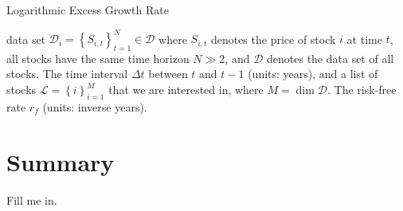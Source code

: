 \documentclass[11pt]{article}
\theoremstyle{definition}
\begin{document}
\begin{algorithm}[h]
    \caption{Logarithmic Excess Growth Rate}\label{algo-log-return-distributions-equity}
    \begin{algorithmic}[1]

        \Statex
        \Require data set $\mathcal{D}_{i} = \left\{S_{i,t}\right\}_{t=1}^{N}\in\mathcal{D}$ where $S_{i,t}$ denotes the price of stock $i$ at time $t$, all stocks have the same time horizon $N\gg{2}$, 
		and $\mathcal{D}$ denotes the data set of all stocks.
        \Require The time interval $\Delta{t}$ between $t$ and $t-1$ (units: years), and a list of stocks $\mathcal{L} = \left\{i\right\}_{i=1}^{M}$ that we are interested in, where $M = \dim\mathcal{D}$.
        \Require The risk-free rate $r_{f}$ (units: inverse years).
     
        \Statex
            \EndFor
        \EndFor
		\EndProcedure
    \end{algorithmic}
\end{algorithm}

\section*{Summary}
Fill me in.



\clearpage
\printindex
\end{document}
